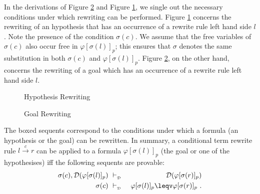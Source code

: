 \documentclass[copyright]{eptcs}
\begin{document}
In the derivations of Figure \ref{gRewDeriv} and Figure \ref{hRewDeriv}, we single out the necessary conditions under which rewriting can be performed. Figure \ref{hRewDeriv} concerns the rewriting of an hypothesis that has an occurrence of a rewrite rule left hand side $l$. Note the presence of the condition $\sigma(c)$. We assume that the free variables of $\sigma(c)$ also occur free in $\varphi[\sigma(l)]_p$; this ensures that $\sigma$ denotes the same substitution in both $\sigma(c)$ and $\varphi[\sigma(l)]_p$. Figure \ref{gRewDeriv}, on the other hand, concerns the rewriting of a goal which has an occurrence of a rewrite rule left hand side $l$.
\begin{figure}[h]
\centering
{}
\caption{Hypothesis Rewriting}
\label{hRewDeriv}
\end{figure}

\begin{figure}[h]
\centering
{}
\caption{Goal Rewriting}
\label{gRewDeriv}
\end{figure}

The boxed sequents correspond to the conditions under which a formula (an hypothesis or the goal) can be rewritten. In summary, a conditional term rewrite rule $l \xrightarrow{c} r$ can be applied to a formula $\varphi[\sigma(l)]_p$ (the goal or one of the hypothesises) iff the following sequents are provable:
\begin{eqnarray}
\sigma(c), \mathcal{D}(\varphi[\sigma(l)]_p)&~\vdash_{_{\mathcal{D}}}~&\mathcal{D}(\varphi[\sigma(r)]_p) \label{exCon1}\\
\sigma(c)&~\vdash_{_{\mathcal{D}}}~&\varphi[\sigma(l)]_p \leqv \varphi[\sigma(r)]_p\label{exCon2}~.
\end{eqnarray}
\end{document}
